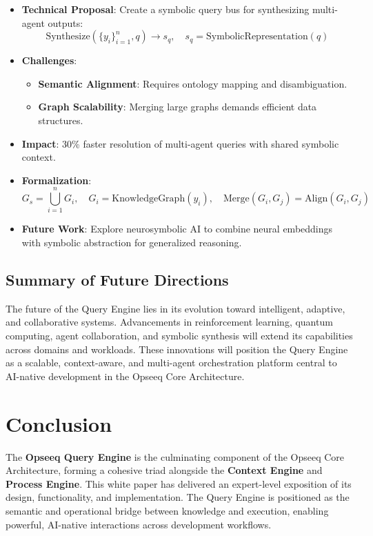 \documentclass[11pt]{article}
\begin{document}
\begin{itemize}
    \item \textbf{Technical Proposal}: Create a symbolic query bus for synthesizing multi-agent outputs:
        \[
        \text{Synthesize}(\{ y_i \}_{i=1}^n, q) \rightarrow s_q,\quad s_q = \text{SymbolicRepresentation}(q)
        \]

    \item \textbf{Challenges}:
        \begin{itemize}
            \item \textbf{Semantic Alignment}: Requires ontology mapping and disambiguation.
            \item \textbf{Graph Scalability}: Merging large graphs demands efficient data structures.
        \end{itemize}

    \item \textbf{Impact}: 30\% faster resolution of multi-agent queries with shared symbolic context.

    \item \textbf{Formalization}:
        \[
        G_s = \bigcup_{i=1}^n G_i,\quad G_i = \text{KnowledgeGraph}(y_i),\quad \text{Merge}(G_i, G_j) = \text{Align}(G_i, G_j)
        \]

    \item \textbf{Future Work}: Explore neurosymbolic AI to combine neural embeddings with symbolic abstraction for generalized reasoning.
\end{itemize}

\subsection{Summary of Future Directions}

The future of the Query Engine lies in its evolution toward intelligent, adaptive, and collaborative systems. Advancements in reinforcement learning, quantum computing, agent collaboration, and symbolic synthesis will extend its capabilities across domains and workloads. These innovations will position the Query Engine as a scalable, context-aware, and multi-agent orchestration platform central to AI-native development in the Opseeq Core Architecture.


\section{Conclusion}
\label{sec:conclusion}

The \textbf{Opseeq Query Engine} is the culminating component of the Opseeq Core Architecture, forming a cohesive triad alongside the \textbf{Context Engine} and \textbf{Process Engine}. This white paper has delivered an expert-level exposition of its design, functionality, and implementation. The Query Engine is positioned as the semantic and operational bridge between knowledge and execution, enabling powerful, AI-native interactions across development workflows.
\end{document}
